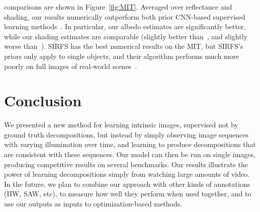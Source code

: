 \documentclass[10pt,twocolumn,letterpaper]{article}
\begin{document}
comparisons are shown in Figure~\ref{fig:MIT}.
Averaged over reflectance and shading, our results numerically
outperform both prior CNN-based supervised learning
methods~\cite{narihira2015direct,shi2016learning}. In particular,
our albedo estimates are significantly better, while our shading
estimates are comparable (slightly better
than~\cite{narihira2015direct}, and slightly worse
than~\cite{shi2016learning}). SIRFS has the best numerical results on
the MIT, but SIRFS's priors only apply to single objects,
and their algorithm performs much more poorly on full images of
real-world scenes~\cite{narihira2015direct,shi2016learning}.



\section{Conclusion}
We presented a new method for learning intrinsic images, supervised
not by ground truth decompositions, but instead by simply observing
image sequences with varying illumination over time, and learning to
produce decompositions that are consistent with these sequences. Our
model can then be run on single images, producing competitive results
on several benchmarks. Our results illustrate the power of learning
decompositions simply from watching large amounts of video. In the
future, we plan to combine our approach with other kinds of
annotations (IIW, SAW, etc), to measure how well they perform when
used together, and to use our outputs as inputs to optimization-based
methods.


\newpage{\small


}
\end{document}
